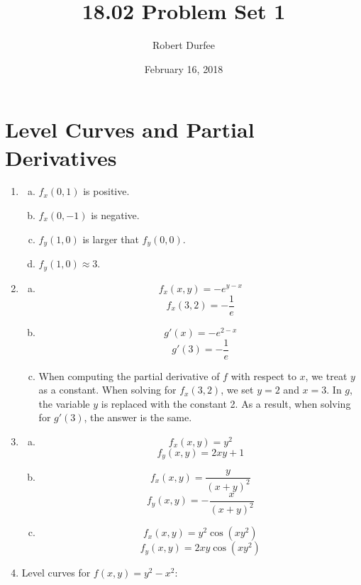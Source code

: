 \documentclass{article}
\title{ 18.02 Problem Set 1 }
\author{ Robert Durfee }
\date{ February 16, 2018 }
\begin{document}
\maketitle

\section{ Level Curves and Partial Derivatives }

\begin{enumerate}[1.]
  \item \begin{enumerate}[a.]
      \item $f_{x}(0, 1)$ is positive.
      \item $f_{x}(0, -1)$ is negative.
      \item $f_{y}(1, 0)$ is larger that $f_{y}(0, 0)$.
      \item $f_{y}(1, 0) \approx 3$.
    \end{enumerate}
  \item \begin{enumerate}[a.]
      \item $$ f_{x}(x, y) = -e^{y - x} $$
        $$ f_{x}(3, 2) = -\frac{ 1 }{ e } $$
      \item $$ g'(x) = -e^{2 - x} $$
        $$ g'(3) = -\frac{ 1 }{ e }$$
      \item When computing the partial derivative of $f$ with respect to $x$, we
        treat $y$ as a constant. When solving for $f_{x}(3, 2)$, we set $y = 2$
        and $x = 3$.  In $g$, the variable $y$ is replaced with the constant 2.
        As a result, when solving for $g'(3)$, the answer is the same.
    \end{enumerate}
  \item \begin{enumerate}[a.]
      \item $$ f_{x}(x, y) = y^{2} $$
        $$ f_{y}(x, y) = 2xy + 1 $$
      \item $$ f_{x}(x, y) = \frac{ y }{ (x + y)^{2} } $$
        $$ f_{y}(x, y) = -\frac{ x }{ (x + y)^{2} } $$
      \item $$ f_{x}(x, y) = y^{2} \cos(xy^{2}) $$
        $$ f_{y}(x, y) = 2xy \cos(xy^{2}) $$
    \end{enumerate}
  \item Level curves for $f(x,y) = y^{2} - x^{2}$:


\end{enumerate}
\end{document}
